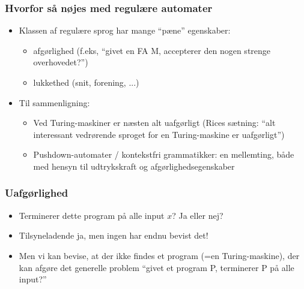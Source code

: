 \documentclass[]{beamer}
\begin{document}
\begin{frame}
\frametitle{Hvorfor så nøjes med regulære automater}
\begin{itemize}
\item Klassen af regulære sprog har mange “pæne” egenskaber:
\begin{itemize}
\item afgørlighed (f.eks, “givet en FA M, accepterer den nogen strenge overhovedet?”)
\item lukkethed (snit, forening, ...)
\end{itemize}

\item Til sammenligning:

\begin{itemize}
\item Ved Turing-maskiner er næsten alt uafgørligt
(Rices sætning: “alt interessant vedrørende sproget for en Turing-maskine er uafgørligt”)
\item Pushdown-automater / kontekstfri grammatikker:
en mellemting, både med hensyn til udtrykskraft og afgørlighedsegenskaber
\end{itemize}

\end{itemize}
\end{frame}

\begin{frame}
\frametitle{Uafgørlighed}
\begin{center}
\end{center}
\begin{itemize}
\item Terminerer dette program på alle input $x$? Ja eller nej?
\item Tilsyneladende ja, men ingen har endnu bevist det!
\item Men vi kan bevise, at der ikke findes et program (=en Turing-maskine), 
der kan afgøre det generelle problem “givet et program P, terminerer P på alle input?”
\end{itemize}

\end{frame}
\end{document}
